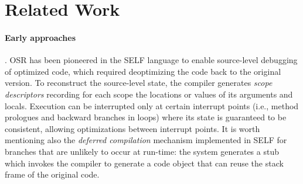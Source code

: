 \section{Related Work}
\label{se:related}

\paragraph{Early approaches}. OSR has been pioneered in the SELF language\cite{holzle1992self} to enable source-level debugging of optimized code, which required deoptimizing the code back to the original version. To reconstruct the source-level state, the compiler generates {\em scope descriptors} recording for each scope the locations or values of its arguments and locals. Execution can be interrupted only at certain interrupt points (i.e., method prologues and backward branches in loops) where its state is guaranteed to be consistent, allowing optimizations between interrupt points. It is worth mentioning also the {\em deferred compilation} mechanism\cite{chambers1991self} implemented in SELF for branches that are unlikely to occur at run-time: the system generates a stub which invokes the compiler to generate a code object that can reuse the stack frame of the original code.

\cite{fink2003design,detlefs2001method,soman2006efficient,lameed2013modular,steiner2007adaptive,chambers1992design}

  
  
  
  
  